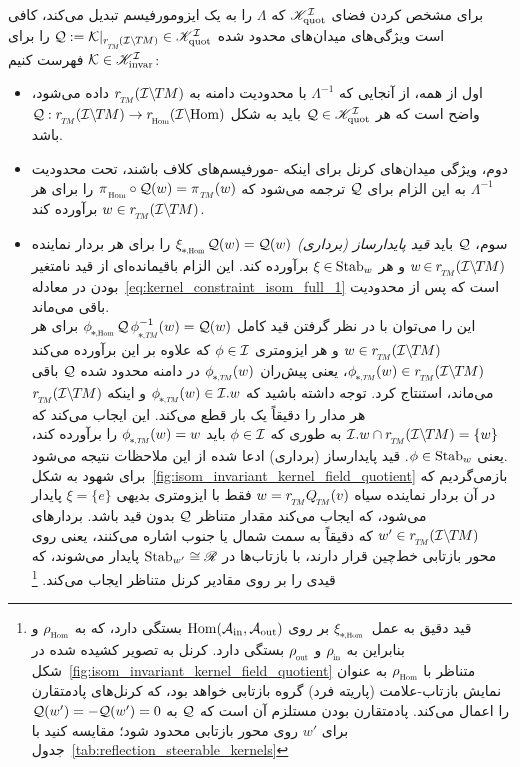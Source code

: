 برای مشخص کردن فضای $\mathscr{K}_\textup{quot}^{\mathcal{I}}$ که $\Lambda$ را به یک ایزومورفیسم تبدیل می‌کند، کافی است ویژگی‌های میدان‌های محدود شده $\Q := \Krestr \in \KIquot$ را برای $\mathcal{K} \in \mathscr{K}_\textup{invar}^{\mathcal{I}}$ فهرست کنیم:
\begin{itemize}[leftmargin=0.6cm]

\item[{\rule[2.2pt]{2pt}{2pt}}]
اول از همه، از آنجایی که $\Lambda^{-1}$ با محدودیت دامنه به $\rTM(\ITM)$ داده می‌شود، واضح است که هر $\mathcal{Q} \in \mathscr{K}_\textup{quot}^{\mathcal{I}}$ باید به شکل $\Q: \rTM(\ITM) \to \rHom(\IHom)$ باشد.

\item[{\rule[2.2pt]{2pt}{2pt}}]
دوم، ویژگی میدان‌های کرنل برای اینکه -مورفیسم‌های کلاف باشند، تحت محدودیت $\Lambda^{-1}$ به این الزام برای $\mathcal{Q}$ ترجمه می‌شود که $\piHom\circ\Q(w) = \piTM(w)$ را برای هر $w\in \rTM(\ITM)$ برآورده کند.

\item[{\rule[2.2pt]{2pt}{2pt}}]
سوم، $\mathcal{Q}$ باید \emph{قید پایدارساز (برداری)} $\dxiHom \Q(w) = \Q(w)$ را برای هر بردار نماینده $w \mkern-2mu\in\mkern-1mu \rTM(\ITM)$ و هر $\xi \mkern-1mu\in\mkern-1mu \operatorname{Stab}_{w}$ برآورده کند.
این الزام باقیمانده‌ای از قید نامتغیر بودن در معادله~\eqref{eq:kernel_constraint_isom_full_1} است که پس از محدودیت باقی می‌ماند.
\\
این را می‌توان با در نظر گرفتن قید کامل $\dphiHom \Q\, \dphiTMinv(w) = \Q(w)$ برای هر $w \in \rTM(\ITM)$ و هر ایزومتری $\phi\in\mathcal{I}$ که علاوه بر این برآورده می‌کند $\dphiTM(w) \in \rTM(\ITM)$، یعنی پیش‌ران $\dphiTM(w)$ در دامنه محدود شده $\mathcal{Q}$ باقی می‌ماند، استنتاج کرد.
توجه داشته باشید که $\dphiTM(w) \in \I.w$ و اینکه $\rTM(\ITM)$ هر مدار را دقیقاً یک بار قطع می‌کند.
این ایجاب می‌کند که $\I.w \cap \rTM(\ITM) = \{w\}$ به طوری که $\phi\in\mathcal{I}$ باید $\dphiTM(w)=w$ را برآورده کند، یعنی $\phi\in \operatorname{Stab}_{w}$.
قید پایدارساز (برداری) ادعا شده از این ملاحظات نتیجه می‌شود.
\\
برای شهود به شکل~\ref{fig:isom_invariant_kernel_field_quotient} بازمی‌گردیم که در آن بردار نماینده سیاه $w = \rTM\QTM(v)$ فقط با ایزومتری بدیهی $\xi=\{e\}$ پایدار می‌شود، که ایجاب می‌کند مقدار متناظر $\mathcal{Q}$ بدون قید باشد.
بردارهای $w' \in \rTM(\ITM)$ که دقیقاً به سمت شمال یا جنوب اشاره می‌کنند، یعنی روی محور بازتابی خط‌چین قرار دارند، با بازتاب‌ها در $\operatorname{Stab}_{w'}\cong\mathscr{R}$ پایدار می‌شوند، که قیدی را بر روی مقادیر کرنل متناظر ایجاب می‌کند.%
\footnote{
    قید دقیق به عمل $\dxiHom$ بر روی $\operatorname{Hom}(\mathcal{A}_\textup{in},\mathcal{A}_\textup{out})$ بستگی دارد، که به $\rhoHom$ و بنابراین به $\rhoin$ و $\rhoout$ بستگی دارد.
    کرنل به تصویر کشیده شده در شکل~\eqref{fig:isom_invariant_kernel_field_quotient} متناظر با $\rhoHom$ به عنوان نمایش بازتاب-علامت (پاریته فرد) گروه بازتابی خواهد بود، که کرنل‌های پادمتقارن را اعمال می‌کند.
    پادمتقارن بودن مستلزم آن است که $\mathcal{Q}$ به $\mathcal{Q}(w') = -\mathcal{Q}(w') = 0$ برای $w'$ روی محور بازتابی محدود شود؛ مقایسه کنید با جدول~\ref{tab:reflection_steerable_kernels}
}


\end{itemize}
